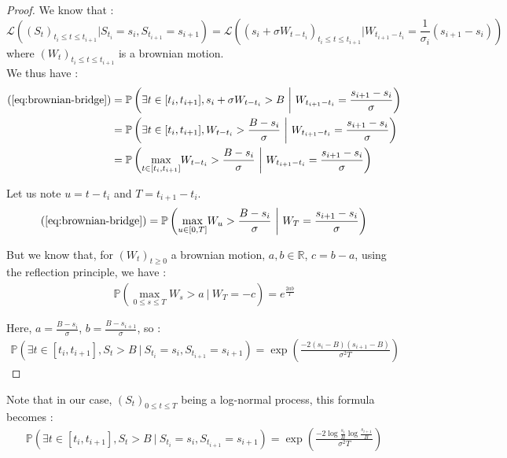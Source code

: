\documentclass[a4paper,11pt,english]{book}
\begin{document}
\begin{proof}
We know that :
$$\mathcal{L}((S_t)_{t_i \leq t \leq t_{i+1}}|S_{t_i}=s_i,S_{t_{i+1}}=s_{i+1})=\mathcal{L}((s_i+\sigma W_{t-t_i})_{t_i \leq t \leq t_{i+1}}|W_{t_{i+1}-t_i}=\frac{1}{\sigma_i}(s_{i+1}-s_i))$$
where $(W_t)_{t_i \leq t \leq t_{i+1}}$ is a brownian motion.\\

We thus have :
$$\begin{aligned}
(\ref{eq:brownian-bridge}) &=  \mathbb{P}\left(\exists t \in [t_i,t_{i+1}],s_i+\sigma W_{t-t_i}>B~\bigg\vert~W_{t_{i+1}-t_i}=\frac{s_{i+1}-s_i}{\sigma}\right) \\
&=  \mathbb{P}\left(\exists t \in [t_i,t_{i+1}],W_{t-t_i}>\frac{B-s_i}{\sigma}~\bigg\vert~W_{t_{i+1}-t_i}=\frac{s_{i+1}-s_i}{\sigma}\right)\\
&=  \mathbb{P}\left(\underset{t \in [t_i,t_{i+1}]}{\max} W_{t-t_i}>\frac{B-s_i}{\sigma}~\bigg\vert~W_{t_{i+1}-t_i}=\frac{s_{i+1}-s_i}{\sigma}\right)
\end{aligned}$$

Let us note $u=t-t_i$ and $T=t_{i+1}-t_{i}$.
$$\begin{aligned}
(\ref{eq:brownian-bridge}) = \mathbb{P}\left(\underset{u \in [0,T]}{\max} W_{u}>\frac{B-s_i}{\sigma}~\bigg\vert~W_{T}=\frac{s_{i+1}-s_i}{\sigma}\right)
\end{aligned}$$

But we know that, for $(W_t)_{t \geq 0}$ a brownian motion, $a,b \in \mathbb{R}$, $c=b-a$, using the reflection principle, we have :
$$\begin{aligned}
\mathbb{P}\left(\underset{0 \leq s \leq T}{\max} W_{s}>a~\bigg\vert~W_{T}=-c\right) = e^{\frac{2ab}{T}}
\end{aligned}$$

Here, $a=\frac{B-s_i}{\sigma}$, $b=\frac{B-s_{i+1}}{\sigma}$, so :
$$\begin{aligned}
\mathbb{P}(\exists t \in [t_i,t_{i+1}],S_t>B~|~S_{t_i}=s_i,S_{t_{i+1}}=s_{i+1}) = \exp\left(\frac{-2(s_i-B)(s_{i+1}-B)}{\sigma^2 T}\right)
\end{aligned}$$
\end{proof}

Note that in our case, $(S_t)_{0 \leq t \leq T}$ being a log-normal process, this formula becomes :
$$\begin{aligned}
\mathbb{P}(\exists t \in [t_i,t_{i+1}],S_t>B~|~S_{t_i}=s_i,S_{t_{i+1}}=s_{i+1}) = \exp\left(\frac{-2\log{\frac{s_i}{B}}\log{\frac{s_{i+1}}{B}}}{\sigma^2 T}\right)
\end{aligned}$$

\endgroup
\end{document}
